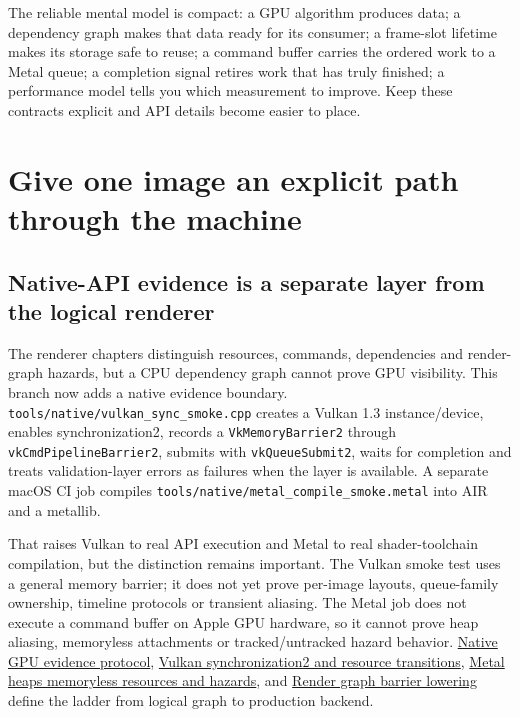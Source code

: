 The reliable mental model is compact: a GPU algorithm produces data; a dependency graph makes that data ready for its consumer; a frame-slot lifetime makes its storage safe to reuse; a command buffer carries the ordered work to a Metal queue; a completion signal retires work that has truly finished; a performance model tells you which measurement to improve. Keep these contracts explicit and API details become easier to place.

\section{Give one image an explicit path through the machine}\label{05-engine-i-ch019-give-one-image-an-explicit-path-through-the-machine}

\subsection{Native-API evidence is a separate layer from the logical renderer}\label{05-engine-i-ch019-native-api-evidence-is-a-separate-layer-from-the-logical-renderer}

The renderer chapters distinguish resources, commands, dependencies and render-graph hazards, but a CPU dependency graph cannot prove GPU visibility. This branch now adds a native evidence boundary. \texttt{tools/native/vulkan\_sync\_smoke.cpp} creates a Vulkan 1.3 instance/device, enables synchronization2, records a \texttt{VkMemoryBarrier2} through \texttt{vkCmdPipelineBarrier2}, submits with \texttt{vkQueueSubmit2}, waits for completion and treats validation-layer errors as failures when the layer is available. A separate macOS CI job compiles \texttt{tools/native/metal\_compile\_smoke.metal} into AIR and a metallib.

That raises Vulkan to real API execution and Metal to real shader-toolchain compilation, but the distinction remains important. The Vulkan smoke test uses a general memory barrier; it does not yet prove per-image layouts, queue-family ownership, timeline protocols or transient aliasing. The Metal job does not execute a command buffer on Apple GPU hardware, so it cannot prove heap aliasing, memoryless attachments or tracked/untracked hazard behavior. \hyperref[appendix-1680333ac796]{Native GPU evidence protocol}, \hyperref[appendix-f15ce0d9c170]{Vulkan synchronization2 and resource transitions}, \hyperref[appendix-563b2cb23fc3]{Metal heaps memoryless resources and hazards}, and \hyperref[appendix-0fc95374cb7e]{Render graph barrier lowering} define the ladder from logical graph to production backend.

